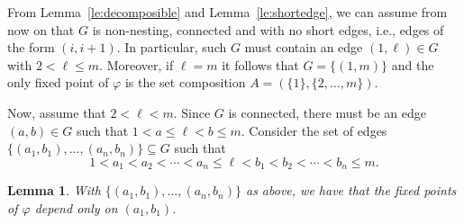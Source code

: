\documentclass[10pt]{amsart}
\newtheorem{lemma}[theorem]{Lemma}
\theoremstyle{definition}
\begin{document}
From Lemma~\ref{le:decomposible} and Lemma~\ref{le:shortedge}, we can assume from now on that $G$ is non-nesting, connected and with no short edges, i.e., edges of the form $(i,i+1)$. In particular, such $G$ must contain an edge $(1,\ell)\in G$ with $2<\ell\le m$. Moreover, if $\ell=m$ it follows that $G=\{(1,m)\}$ and the only fixed point of $\varphi$ is the set composition $A=(\{1\},\{2,\ldots,m\})$. 


Now, assume that $2<\ell<m$. Since $G$ is connected, there must be an edge
$(a,b)\in G$ such that $1<a\le \ell<b\le m$. Consider the set of edges $\big\{(a_1,b_1),\ldots,(a_n,b_n)\big\}\subseteq G$ such that $$1<a_1<a_2<\cdots<a_n\le\ell<b_1<b_2<\cdots< b_n\le m.$$

\begin{lemma}\label{le:nequal1} With $\big\{(a_1,b_1),\ldots,(a_n,b_n)\big\}$ as above, we have that the fixed points of $\varphi$ depend only on $(a_1,b_1)$.
\end{lemma}
\end{document}
